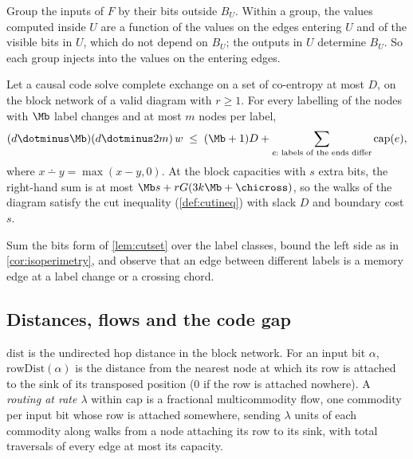 \begin{outline}
Group the inputs of $F$ by their bits outside $B_U$. Within a group, the values computed inside $U$
are a function of the values on the edges entering $U$ and of the visible bits in $U$, which do not
depend on $B_U$; the outputs in $U$ determine $B_U$. So each group injects into the values on the
entering edges.
\end{outline}

\begin{corollary}\label{cor:isoperimetry-code}
Let a causal code solve complete exchange on a set of co-entropy at most $D$, on the block network
of a valid diagram with $r\ge1$. For every labelling of the nodes with $\Mb$ label changes and at
most $m$ nodes per label,
\[
  (d\dotminus\Mb)(d\dotminus2m)\,w\;\le\;(\Mb+1)D+\sum_{e:\;\text{labels of the ends differ}}\mathrm{cap}(e),
\]
where $x\dotminus y=\max(x-y,0)$.
At the block capacities with $s$ extra bits, the right-hand sum is at most
$\Mb s+rG(3k\Mb+\chicross)$, so the walks of the diagram satisfy the cut inequality
(\cref{def:cutineq}) with slack $D$ and boundary cost $s$.
\end{corollary}

\begin{outline}
Sum the bits form of \cref{lem:cutset} over the label classes, bound the left side as in
\cref{cor:isoperimetry}, and observe that an edge between different labels is a memory edge at a
label change or a crossing chord.
\end{outline}

\subsection{Distances, flows and the code gap}

\begin{definition}\label{def:routing}
$\mathrm{dist}$ is the undirected hop distance in the block network. For an input bit $\alpha$,
$\mathrm{rowDist}(\alpha)$ is the distance from the nearest node at which its row is attached to the sink
of its transposed position ($0$ if the row is attached nowhere). A \emph{routing at rate $\lambda$}
within $\mathrm{cap}$ is a fractional multicommodity flow, one commodity per input bit whose row is
attached somewhere, sending $\lambda$ units of each commodity along walks from a node attaching its
row to its sink, with total traversals of every edge at most its capacity.
\end{definition}

